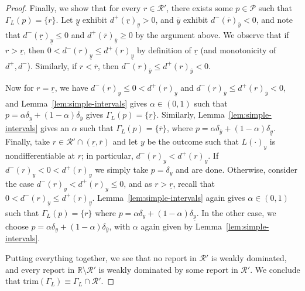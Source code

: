 \documentclass[11pt]{article}
\newcommand{\Comments}{1}
\newcommand{\mytodo}[2]{\ifnum\Comments=1%
  \todo[linecolor=#1!80!black,backgroundcolor=#1,bordercolor=#1!80!black]{#2}\fi}
\newcommand{\raft}[1]{\mytodo{green!20!white}{RF: #1}}
\newcommand{\reals}{\mathbb{R}}
\renewcommand{\P}{\mathcal{P}}
\newcommand{\R}{\mathcal{R}}
\renewcommand{\P}{\mathcal{P}}
\newcommand{\trim}{\mathrm{trim}}
\begin{document}
\begin{proof}

  Finally, we show that for every $r\in \R'$, there exists some $p\in\P$ such that $\Gamma_L(p) = \{r\}$.
  Let $\underline y$ exhibit $d^+(\underline r)_{\underline y} > 0$, and $\overline y$ exhibit $d^-(\overline r)_{\overline y} < 0$, and note that $d^-(\underline r)_{\underline y} \leq 0$ and $d^+(\overline r)_{\overline y} \geq 0$ by the argument above.
  We observe that if $r > \underline r$, then $0 < d^-(r)_{\underline y} \leq d^+(r)_{\underline y}$ by definition of $\underline r$ (and monotonicity of $d^+,d^-$).
  Similarly, if $r < \overline r$, then $d^-(r)_{\overline y} \leq d^+(r)_{\overline y} < 0$.

  Now for $r = \underline r$, we have $d^-(r)_{\underline y} \leq 0 < d^+(r)_{\underline y}$ and $d^-(r)_{\overline y} \leq d^+(r)_{\overline y} < 0$, and Lemma~\ref{lem:simple-intervals} gives $\alpha \in (0,1)$ such that $p = \alpha \delta_{\underline y} + (1-\alpha) \delta_{\overline y}$ gives $\Gamma_L(p) = \{\underline r\}$.
  Similarly, Lemma~\ref{lem:simple-intervals} gives an $\alpha$ such that $\Gamma_L(p) = \{\overline r\}$, where $p = \alpha \delta_{\overline y} + (1-\alpha) \delta_{\underline y}$.
  Finally, take $r \in \R' \cap (\underline r, \overline r)$ and let $y$ be the outcome such that $L(\cdot)_y$ is nondifferentiable at $r$; in particular, $d^-(r)_y < d^+(r)_y$.
  If $d^-(r)_y < 0 < d^+(r)_y$ we simply take $p = \delta_y$ and are done.
  Otherwise, consider the case $d^-(r)_y < d^+(r)_y \leq 0$, and as $r > \underline r$, recall that $0 < d^-(r)_{\underline y} \leq d^+(r)_{\underline y}$.
  Lemma~\ref{lem:simple-intervals} again gives $\alpha \in (0,1)$ such that $\Gamma_L(p) = \{r\}$ where $p = \alpha \delta_{y} + (1-\alpha) \delta_{\underline y}$.
  In the other case, we choose $p = \alpha \delta_{y} + (1-\alpha) \delta_{\overline y}$, with $\alpha$ again given by Lemma~\ref{lem:simple-intervals}.
  
  Putting everything together, we see that no report in $\R'$ is weakly dominated, and every report in $\reals\setminus\R'$ is weakly dominated by some report in $\R'$.
  We conclude that $\trim(\Gamma_L) \equiv \Gamma_L \cap \R'$.
\end{proof}
\end{document}
